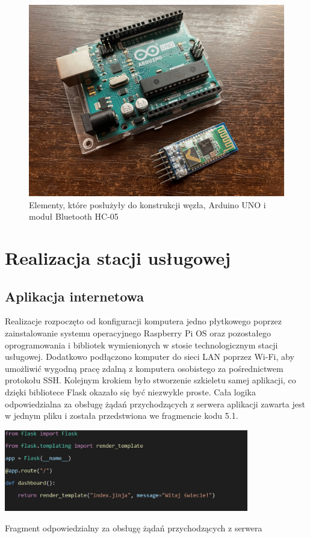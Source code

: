 \documentclass[12pt, twoside, openany]{mwrep}
\begin{document}
\begin{figure}[H]
\centering
\includegraphics[width=\textwidth]{hc05}
\caption{Elementy, które posłużyły do konstrukcji węzła, Arduino UNO i moduł Bluetooth HC-05}
\end{figure}

\chapter{Realizacja stacji usługowej}

\section{Aplikacja internetowa}

Realizacje rozpoczęto od konfiguracji komputera jedno płytkowego poprzez zainstalowanie systemu operacyjnego Raspberry Pi OS oraz pozostałego oprogramowania i bibliotek wymienionych w stosie technologicznym stacji usługowej. Dodatkowo podłączono komputer do sieci LAN poprzez Wi-Fi, aby umożliwić wygodną pracę zdalną z komputera osobistego za pośrednictwem protokołu SSH. Kolejnym krokiem było stworzenie szkieletu samej aplikacji, co dzięki bibliotece Flask okazało się być niezwykle proste. Cała logika odpowiedzialna za obsługę żądań przychodzących z serwera aplikacji zawarta jest w jednym pliku i została przedstwiona we fragmencie kodu 5.1.
\begin{algorithm}[H]
\centering
\includegraphics[width=0.8\textwidth]{kod}
\caption{Fragment odpowiedzialny za obsługę żądań przychodzących z serwera}
\end{algorithm}
\end{document}
